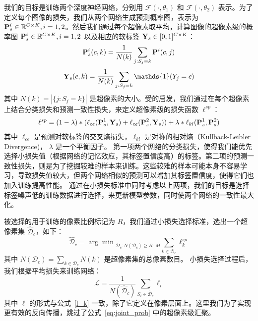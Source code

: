 我们的目标是训练两个深度神经网络，分别用 $\mathcal{F}(\cdot, \theta_1)$ 和 $\mathcal{F}(\cdot, \theta_2)$ 表示。为了定义每个图像的损失，我们从两个网络生成预测概率图，表示为 $\mathbf{P}_s^i\in\mathbb{R}^{C \times K}, i=1,2$。然后我们通过每个超像素取平均，计算图像的超像素级的概率图 $\mathbf{P}_s^i\in\mathbb{R}^{C \times K}, i=1,2$ 以及相应的软标签 ${\mathbf{Y}_s}\in[0,1]^{C\times K}$：
\begin{align} \label{eq:joint_prob}
    \mathbf{P}^i_s(c,k) = \frac{1}{N(k)}\sum_{j:S_j = k} \mathbf{P}^i(c,j)
\end{align}
\begin{align}
    \mb{Y}_s(c,k) =\frac{1}{N(k)} \sum_{j:S_j = k}\mathds{1}(Y_j = c)
\end{align}
其中 $N(k) = |\{j:S_j = k\}|$ 是超像素的大小。受\citet{Wei2020CombatingNL}的启发，我们通过在每个超像素上结合分类损失和预测一致性损失，来定义超像素级的损失函数 $\ell^{sp}$：
\begin{equation}\label{l_k}
	\ell^{sp} = (1-\lambda)*(\ell_{ce}(\mathbf{P}^1_s,\mathbf{Y}_s) + \ell_{ce}(\mathbf{P}^2_s,\mathbf{Y}_s)) + \lambda *\ell_{kl}(\mathbf{P}^1_s,\mathbf{P}^2_s)
\end{equation}
其中 $\ell_{ce}$ 是预测对软标签的交叉熵损失，$\ell_{kl}$ 是对称的相对熵（Kullback-Leibler Divergence)， $\lambda$ 是一个平衡因子。
第一项两个网络的分类损失，使得我们能优先选择小损失值（根据网络的记忆效应，其标签置信度高）的标签。第二项的预测一致性损失，则是为了挖掘较难的样本来训练。这些较难的样本可能本身不容易学习，导致损失值较大，但两个网络相似的预测可以增加其标签置信度，使得它们也加入训练提高性能。
通过在小损失标准中同时考虑以上两项，我们的目标是选择标签噪声低的训练数据进行选择，来更新模型参数，同时使两个网络的一致性最大化。

被选择的用于训练的像素比例标记为 $R$，我们通过小损失选择标准，选出一个超像素集 $\mathcal{\hat{D}}_c$，如下：
\begin{equation}
	{\mathcal{\hat{D}}}_c = {\arg\min}_{{\mathcal{D}_c}: N({\mathcal{D}_c})\ge R\cdot M} \sum_{k\in{\mathcal{D}_c}}\ell^{sp}_k 
\end{equation}
其中 $N({\mathcal{D}_c}) = \sum_{k\in {\mathcal{D}_c}} N(k)$ 是超像素集的总像素数目。
小损失选择过程后，我们根据平均损失来训练网络：
\begin{equation}
	\mathcal{L} = \frac{1}{N(\mathcal{\hat{D}}_c)}\sum_{S_i \in \mathcal{\hat{D}}_c}\ell_i
\end{equation}
其中 $\ell$ 的形式与公式~\ref{l_k} 一致，除了它定义在像素层面上。这里我们为了实现更有效的反向传播，跳过了公式~\ref{eq:joint_prob} 中的超像素级汇聚。

